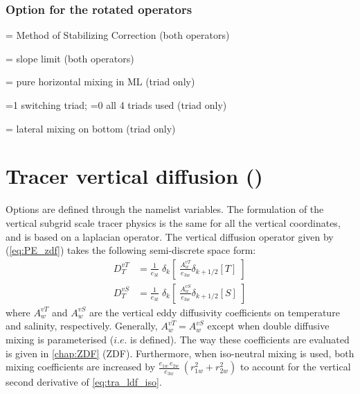 \documentclass[../main/NEMO_manual]{subfiles}
\begin{document}
\subsubsection{Option for the rotated operators}
\label{subsec:TRA_ldf_options}

 = Method of Stabilizing Correction (both operators)

 = slope limit (both operators)

 = pure horizontal mixing in ML (triad only)

 =1 switching triad;
                   =0 all 4 triads used (triad only) 

 = lateral mixing on bottom (triad only)

\section{Tracer vertical diffusion (\protect{})}
\label{sec:TRA_zdf}


Options are defined through the  namelist variables.
The formulation of the vertical subgrid scale tracer physics is the same for all the vertical coordinates,
and is based on a laplacian operator.
The vertical diffusion operator given by (\autoref{eq:PE_zdf}) takes the following semi-discrete space form:
\[
  \begin{split}
    D^{vT}_T &= \frac{1}{e_{3t}} \; \delta_k \left[ \;\frac{A^{vT}_w}{e_{3w}}  \delta_{k+1/2}[T] \;\right]    \\
    D^{vS}_T &= \frac{1}{e_{3t}} \; \delta_k \left[ \;\frac{A^{vS}_w}{e_{3w}}  \delta_{k+1/2}[S] \;\right]
  \end{split}
\]
where $A_w^{vT}$ and $A_w^{vS}$ are the vertical eddy diffusivity coefficients on temperature and salinity,
respectively.
Generally, $A_w^{vT}=A_w^{vS}$ except when double diffusive mixing is parameterised ($i.e.$  is defined).
The way these coefficients are evaluated is given in \autoref{chap:ZDF} (ZDF).
Furthermore, when iso-neutral mixing is used, both mixing coefficients are increased by
$\frac{e_{1w}\,e_{2w} }{e_{3w} }\ \left( {r_{1w} ^2+r_{2w} ^2} \right)$ to account for
the vertical second derivative of \autoref{eq:tra_ldf_iso}.
\end{document}
